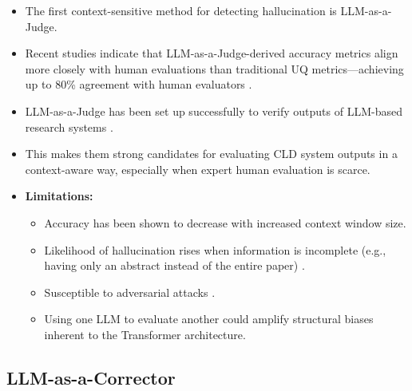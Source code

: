 \documentclass[12pt]{article}
\begin{document}
\begin{itemize}
    \item The first context-sensitive method for detecting hallucination is LLM-as-a-Judge.
    \item Recent studies indicate that LLM-as-a-Judge-derived accuracy metrics align more closely with human evaluations than traditional UQ metrics---achieving up to 80\% agreement with human evaluators \cite{li2024llms}.
    \item LLM-as-a-Judge has been set up successfully to verify outputs of LLM-based research systems \cite{lu2024ai}.
    \item This makes them strong candidates for evaluating CLD system outputs in a context-aware way, especially when expert human evaluation is scarce.
    \item \textbf{Limitations:}
    \begin{itemize}
        \item Accuracy has been shown to decrease with increased context window size.
        \item Likelihood of hallucination rises when information is incomplete (e.g., having only an abstract instead of the entire paper) \cite{Wang2024}.
        \item Susceptible to adversarial attacks \cite{shi2024optimization, li2024llms}.
        \item Using one LLM to evaluate another could amplify structural biases inherent to the Transformer architecture.
    \end{itemize}
\end{itemize}

\subsection{LLM-as-a-Corrector}
\end{document}
